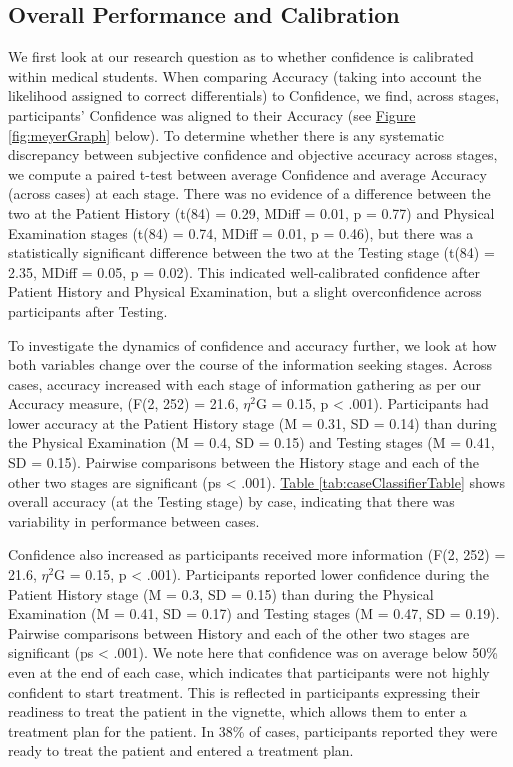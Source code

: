 \documentclass[a4paper, nobind]{templates/ociamthesis}
\begin{document}
\subsection{Overall Performance and Calibration}\label{overall-performance-and-calibration}

We first look at our research question as to whether confidence is calibrated within medical students. When comparing Accuracy (taking into account the likelihood assigned to correct differentials) to Confidence, we find, across stages, participants' Confidence was aligned to their Accuracy (see \hyperref[fig:meyerGraph]{Figure \ref{fig:meyerGraph}} below). To determine whether there is any systematic discrepancy between subjective confidence and objective accuracy across stages, we compute a paired t-test between average Confidence and average Accuracy (across cases) at each stage. There was no evidence of a difference between the two at the Patient History (t(84) = 0.29, MDiff = 0.01, p = 0.77) and Physical Examination stages (t(84) = 0.74, MDiff = 0.01, p = 0.46), but there was a statistically significant difference between the two at the Testing stage (t(84) = 2.35, MDiff = 0.05, p = 0.02). This indicated well-calibrated confidence after Patient History and Physical Examination, but a slight overconfidence across participants after Testing.

\hfill\break
To investigate the dynamics of confidence and accuracy further, we look at how both variables change over the course of the information seeking stages. Across cases, accuracy increased with each stage of information gathering as per our Accuracy measure, (F(2, 252) = 21.6, \(\eta^2\)G = 0.15, p \textless{} .001). Participants had lower accuracy at the Patient History stage (M = 0.31, SD = 0.14) than during the Physical Examination (M = 0.4, SD = 0.15) and Testing stages (M = 0.41, SD = 0.15). Pairwise comparisons between the History stage and each of the other two stages are significant (ps \textless{} .001). \hyperref[tab:caseClassifierTable]{Table \ref{tab:caseClassifierTable}} shows overall accuracy (at the Testing stage) by case, indicating that there was variability in performance between cases.

\hfill\break
Confidence also increased as participants received more information (F(2, 252) = 21.6, \(\eta^2\)G = 0.15, p \textless{} .001). Participants reported lower confidence during the Patient History stage (M = 0.3, SD = 0.15) than during the Physical Examination (M = 0.41, SD = 0.17) and Testing stages (M = 0.47, SD = 0.19). Pairwise comparisons between History and each of the other two stages are significant (ps \textless{} .001). We note here that confidence was on average below 50\% even at the end of each case, which indicates that participants were not highly confident to start treatment. This is reflected in participants expressing their readiness to treat the patient in the vignette, which allows them to enter a treatment plan for the patient. In 38\% of cases, participants reported they were ready to treat the patient and entered a treatment plan.
\end{document}
